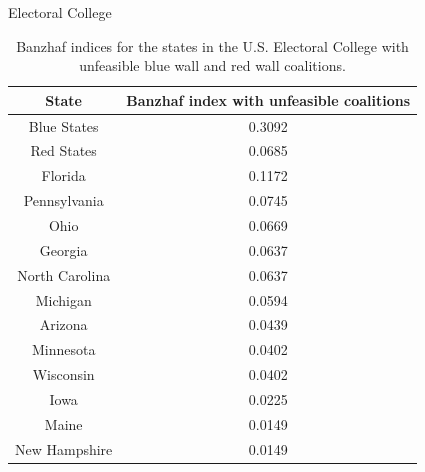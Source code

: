 \documentclass[11pt]{amsart}
\theoremstyle{plain}
\theoremstyle{definition}
\theoremstyle{remark}
\begin{document}
\begin{subsubsection}{Electoral College}
\begin{table}\label{T:Electoral}
\begin{center}
\begin{tabular}{| c | c|}
\hline
State & Banzhaf index with unfeasible coalitions\\
\hline
\hline
Blue States & 0.3092\\
\hline
Red States & 0.0685\\
\hline
Florida & 0.1172\\
\hline
Pennsylvania & 0.0745\\
\hline
Ohio & 0.0669\\
\hline
Georgia & 0.0637\\
\hline
North Carolina & 0.0637\\
\hline
Michigan & 0.0594\\
\hline
Arizona & 0.0439\\
\hline
Minnesota & 0.0402\\
\hline
Wisconsin & 0.0402\\
\hline
Iowa & 0.0225\\
\hline
Maine & 0.0149\\ 
\hline
New Hampshire & 0.0149 \\
\hline

\end{tabular}
\end{center}
\caption{Banzhaf indices for the states in the U.S. Electoral College with unfeasible blue wall and red wall coalitions.}
\end{table}


\end{subsubsection}
\end{document}
